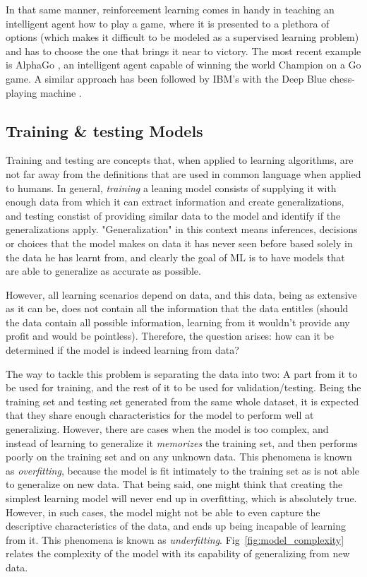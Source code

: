 In that same manner, reinforcement learning comes in handy in teaching an intelligent agent how to play a game, where it is presented to a plethora of options (which makes it difficult to be modeled as a supervised learning problem) and has to choose the one that brings it near to victory. The most recent example is AlphaGo \cite{Fu2017}, an intelligent agent capable of winning the world Champion on a Go game. A similar approach has been followed by IBM's with the Deep Blue chess-playing machine \cite{Hsu1999}.

\subsection{Training \& testing  Models}
Training and testing are concepts that, when applied to learning algorithms, are not far away from the definitions that are used in common language when applied to humans. In general, \emph{training} a leaning model consists of supplying it with enough data from which it can extract information and create generalizations, and testing constist of providing similar data to the model and identify if the generalizations apply. "Generalization" in this context means inferences, decisions or choices that the model makes on data it has never seen before based solely in the data he has learnt from, and clearly the goal of \ac{ML} is to have models that are able to generalize as accurate as possible.

However, all learning scenarios depend on data, and this data, being as extensive as it can be, does not contain all the information that the data entitles (should the data contain all possible information, learning from it wouldn't provide any profit and would be pointless). Therefore, the question arises: how can it be determined if the model is indeed learning from data?

The way to tackle this problem is separating the data into two: A part from it to be used for training, and the rest of it to be used for validation/testing. Being the training set and testing set generated from the same whole dataset, it is expected that they share enough characteristics for the model to perform well at generalizing. However, there are cases when the model is too complex, and instead of learning to generalize it \emph{memorizes} the training set, and then performs poorly on the training set and on any unknown data. This phenomena is known as \emph{overfitting}, because the model is fit intimately to the training set as is not able to generalize on new data. That being said, one might think that creating the simplest learning model will never end up in overfitting, which is absolutely true. However, in such cases, the model might not be able to even capture the descriptive characteristics of the data, and ends up being incapable of learning from it. This phenomena is known as \emph{underfitting}. Fig~\ref{fig:model_complexity} relates the complexity of the model with its capability of generalizing from new data.

